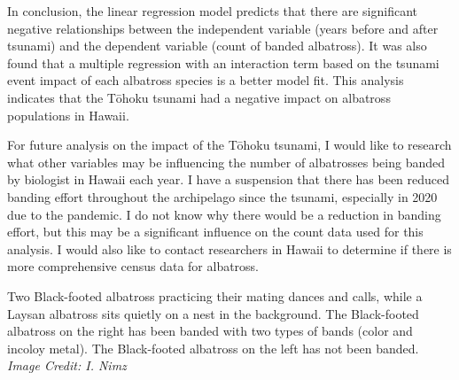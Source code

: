 \documentclass[
]{article}
\begin{document}
In conclusion, the linear regression model predicts that there are
significant negative relationships between the independent variable
(years before and after tsunami) and the dependent variable (count of
banded albatross). It was also found that a multiple regression with an
interaction term based on the tsunami event impact of each albatross
species is a better model fit. This analysis indicates that the Tōhoku
tsunami had a negative impact on albatross populations in Hawaii.

For future analysis on the impact of the Tōhoku tsunami, I would like to
research what other variables may be influencing the number of
albatrosses being banded by biologist in Hawaii each year. I have a
suspension that there has been reduced banding effort throughout the
archipelago since the tsunami, especially in 2020 due to the pandemic. I
do not know why there would be a reduction in banding effort, but this
may be a significant influence on the count data used for this analysis.
I would also like to contact researchers in Hawaii to determine if there
is more comprehensive census data for albatross.

Two Black-footed albatross practicing their mating dances and calls,
while a Laysan albatross sits quietly on a nest in the background. The
Black-footed albatross on the right has been banded with two types of
bands (color and incoloy metal). The Black-footed albatross on the left
has not been banded. \emph{Image Credit: I. Nimz}
\end{document}
